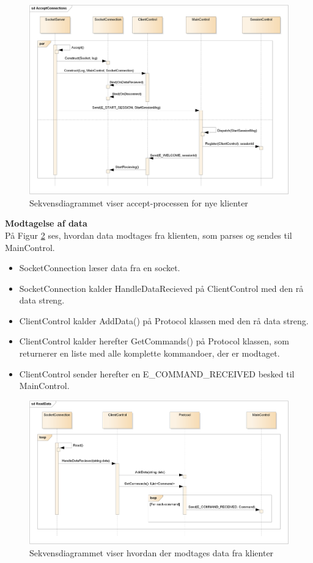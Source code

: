 \begin{figure}[H]
    \centering
    \includegraphics[width=1\textwidth]{Systemdesign/CentralServer/Images/AcceptConnections.png}
    \caption{Sekvensdiagrammet viser accept-processen for nye klienter}
    \label{fig:CSAcceptConnections}
\end{figure}

\textbf{Modtagelse af data}\\
På Figur \ref{fig:CSReadData} ses, hvordan data modtages fra klienten, som parses og sendes til MainControl.

\begin{itemize}
  \item SocketConnection læser data fra en socket.
  \item SocketConnection kalder HandleDataRecieved på ClientControl med den rå data streng.
  \item ClientControl kalder AddData() på Protocol klassen med den rå data streng.
  \item ClientControl kalder herefter GetCommands() på Protocol klassen, som returnerer en liste med alle komplette kommandoer, der er modtaget.
  \item ClientControl sender herefter en E\_COMMAND\_RECEIVED besked til MainControl.
\end{itemize}

\begin{figure}[H]
    \centering
    \includegraphics[width=1\textwidth]{Systemdesign/CentralServer/Images/ReadData.png}
    \caption{Sekvensdiagrammet viser hvordan der modtages data fra klienter}
    \label{fig:CSReadData}
\end{figure}

